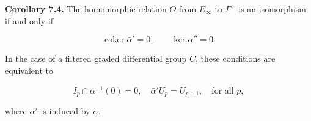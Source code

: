 \textbf{Corollary 7.4.} The homomorphic relation $\Theta$ from $E_\infty$ to $\Gamma^+$ is an isomorphism if and only if

$$
\operatorname{coker} \bar{\alpha}' = 0, \qquad \ker \alpha'' = 0.
$$

In the case of a filtered graded differential group $C$, these conditions are equivalent to

$$
I_p \cap \alpha^{-1}(0) = 0, \quad \bar{\alpha}' \bar{U}_p = \bar{U}_{p+1}, \quad \text{for all } p,
$$

where $\bar{\alpha}'$ is induced by $\bar{\alpha}$.
